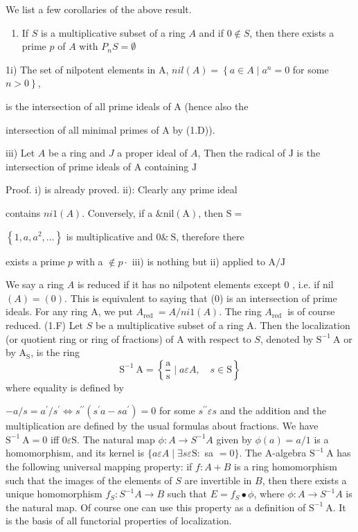 We list a few corollaries of the above result.

\begin{enumerate}
  \item If $S$ is a multiplicative subset of a ring $A$ and if $0 \notin S$, then there exists a prime $p$ of $A$ with $P_{n} S=\emptyset$
\end{enumerate}
1i) The set of nilpotent elements in A, $n i l(A)=\left\{a \in A \mid a^{n}=0\right.$ for some $\left.n>0\right\}$,

is the intersection of all prime ideals of A (hence also the

intersection of all minimal primes of A by (1.D)).

iii) Let $A$ be a ring and $J$ a proper ideal of $A$, Then the radical of $\mathrm{J}$ is the intersection of prime ideals of A containing $\mathrm{J}$

Proof. i) is already proved. ii): Clearly any prime ideal

contains $n i 1(A)$. Conversely, if a $\& \mathrm{nil}(\mathrm{A})$, then $\mathrm{S}=$

$\left\{1, a, a^{2}, \ldots\right\}$ is multiplicative and $0 \& \mathrm{~S}$, therefore there

exists a prime $p$ with a $\notin p \cdot$ iii) is nothing but ii) applied to $\mathrm{A} / \mathrm{J}$

We say a ring $A$ is reduced if it has no nilpotent elements except 0 , i.e. if nil $(A)=(0)$. This is equivalent to saying that (0) is an intersection of prime ideals. For any ring A, we put $A_{\text {red }}=A / n i 1(A)$. The ring $A_{\text {red }}$ is of course reduced. (1.F) Let $S$ be a multiplicative subset of a ring A. Then the localization (or quotient ring or ring of fractions) of A with respect to $S$, denoted by $\mathrm{S}^{-1} \mathrm{~A}$ or by $\mathrm{A}_{\mathrm{S}}$, is the ring
$$
\mathrm{S}^{-1} \mathrm{~A}=\left\{\frac{\mathrm{a}}{\mathrm{s}} \mid a \varepsilon A, \quad s \in \mathrm{S}\right\}
$$
where equality is defined by

$-a / s=a^{\prime} / s^{\prime} \Leftrightarrow s^{\prime \prime}\left(s^{\prime} a-s a^{\prime}\right)=0$ for some $s^{\prime \prime} \varepsilon s$ and the addition and the multiplication are defined by the usual formulas about fractions. We have $\mathrm{S}^{-1} \mathrm{~A}=0$ iff $0 \varepsilon \mathrm{S}$. The natural map $\phi: A \rightarrow S^{-1} A$ given by $\phi(a)=a / 1$ is a homomorphism, and its kernel is $\{a \varepsilon A \mid \exists s \varepsilon \mathrm{S}:$ sa $=0\}$. The A-algebra $\mathrm{S}^{-1} \mathrm{~A}$ has the following universal mapping property: if $f: A+B$ is a ring homomorphism such that the images of the elements of $S$ are invertible in $B$, then there exists a unique homomorphism $f_{S}: S^{-1} A \rightarrow B$ such that $E=f_{S} \bullet \phi$, where $\phi: A \rightarrow S^{-1} A$ is the natural map. Of course one can use this property as a definition of $\mathrm{S}^{-1} \mathrm{~A}$. It is the basis of all functorial properties of localization.

